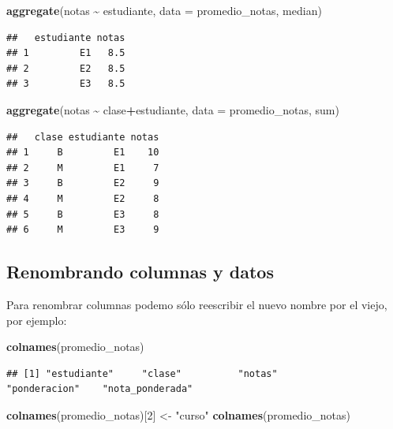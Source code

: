 \documentclass[
]{book}
\newenvironment{Shaded}{\begin{snugshade}}{\end{snugshade}}
\newcommand{\AttributeTok}[1]{\textcolor[rgb]{0.13,0.29,0.53}{#1}}
\newcommand{\DecValTok}[1]{\textcolor[rgb]{0.00,0.00,0.81}{#1}}
\newcommand{\FunctionTok}[1]{\textcolor[rgb]{0.13,0.29,0.53}{\textbf{#1}}}
\newcommand{\NormalTok}[1]{#1}
\newcommand{\OtherTok}[1]{\textcolor[rgb]{0.56,0.35,0.01}{#1}}
\newcommand{\SpecialCharTok}[1]{\textcolor[rgb]{0.81,0.36,0.00}{\textbf{#1}}}
\newcommand{\StringTok}[1]{\textcolor[rgb]{0.31,0.60,0.02}{#1}}
\begin{document}
\begin{Shaded}
\begin{Highlighting}[]
\FunctionTok{aggregate}\NormalTok{(notas }\SpecialCharTok{\textasciitilde{}}\NormalTok{ estudiante, }\AttributeTok{data =}\NormalTok{ promedio\_notas, median)}
\end{Highlighting}
\end{Shaded}

\begin{verbatim}
##   estudiante notas
## 1         E1   8.5
## 2         E2   8.5
## 3         E3   8.5
\end{verbatim}

\begin{Shaded}
\begin{Highlighting}[]
\FunctionTok{aggregate}\NormalTok{(notas }\SpecialCharTok{\textasciitilde{}}\NormalTok{ clase}\SpecialCharTok{+}\NormalTok{estudiante, }\AttributeTok{data =}\NormalTok{ promedio\_notas, sum)}
\end{Highlighting}
\end{Shaded}

\begin{verbatim}
##   clase estudiante notas
## 1     B         E1    10
## 2     M         E1     7
## 3     B         E2     9
## 4     M         E2     8
## 5     B         E3     8
## 6     M         E3     9
\end{verbatim}

\subsection{Renombrando columnas y datos}\label{renombrando-columnas-y-datos}

Para renombrar columnas podemo sólo reescribir el nuevo nombre por el viejo, por ejemplo:\\

\begin{Shaded}
\begin{Highlighting}[]
\FunctionTok{colnames}\NormalTok{(promedio\_notas)}
\end{Highlighting}
\end{Shaded}

\begin{verbatim}
## [1] "estudiante"     "clase"          "notas"          "ponderacion"    "nota_ponderada"
\end{verbatim}

\begin{Shaded}
\begin{Highlighting}[]
\FunctionTok{colnames}\NormalTok{(promedio\_notas)[}\DecValTok{2}\NormalTok{] }\OtherTok{\textless{}{-}} \StringTok{"curso"}
\FunctionTok{colnames}\NormalTok{(promedio\_notas)}
\end{Highlighting}
\end{Shaded}
\end{document}
